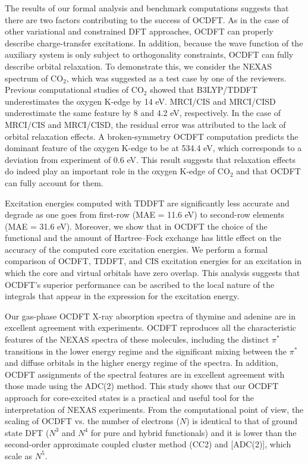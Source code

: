 \documentclass[8.5pt,twoside,twocolumn]{article}
\begin{document}
The results of our formal analysis and benchmark computations suggests that there are two factors contributing to the success of OCDFT.
As in the case of other variational and constrained DFT approaches, OCDFT can properly describe charge-transfer excitations.
In addition, because the wave function of the auxiliary system is only subject to orthogonality constraints, OCDFT can fully describe orbital relaxation.
To demonstrate this, we consider the NEXAS spectrum of CO$_2$, which was suggested as a test case by one of the reviewers. 
Previous computational studies of CO$_2$\cite{Maganas:ji} showed that B3LYP/TDDFT underestimates the oxygen K-edge by 14 eV.
MRCI/CIS and MRCI/CISD underestimate the same feature by 8 and 4.2 eV, respectively.
In the case of MRCI/CIS and MRCI/CISD, the residual error was attributed to the lack of orbital relaxation effects.
A broken-symmetry OCDFT computation predicts the dominant feature of the oxygen K-edge to be at 534.4 eV, which corresponds to a deviation from experiment of 0.6 eV.  This result suggests that relaxation effects do indeed play an important role in the oxygen K-edge of CO$_2$ and that OCDFT can fully account for them.

Excitation energies computed with TDDFT are significantly less accurate and degrade as one goes from first-row (MAE = 11.6 eV) to second-row elements (MAE = 31.6 eV).
Moreover, we show that in OCDFT the choice of the functional and the amount of Hartree--Fock exchange has little effect on the accuracy of the computed core excitation energies.
We perform a formal comparison of OCDFT, TDDFT, and CIS excitation energies for an excitation in which the core and virtual orbitals have zero overlap.
This analysis suggests that OCDFT's superior performance can be ascribed to the local nature of the integrals that appear in the expression for the excitation energy.

Our gas-phase OCDFT X-ray absorption spectra of thymine and adenine are in excellent agreement with experiments. 
OCDFT reproduces all the characteristic features of the NEXAS spectra of these molecules,\cite{plekan_theoretical_2008,wenzel_calculating_2014} including the distinct $\pi^*$ transitions in the lower energy regime and the significant mixing between the $\pi^*$ and diffuse orbitals in the higher energy regime of the spectra.
In addition, OCDFT assignments of the spectral features are in excellent agreement with those made using the ADC(2) method.\cite{plekan_theoretical_2008}
This study shows that our OCDFT approach for core-excited states is a practical and useful tool for the interpretation of NEXAS experiments. 
From the computational point of view, the scaling of OCDFT vs. the number of electrons ($N$) is identical to that of ground state DFT ($N^3$ and $N^4$ for pure and hybrid functionals) and it is lower than the second-order approximate coupled cluster method (CC2)\cite{christiansen_cc2_1995} and [ADC(2)], which scale as $N^5$.
\end{document}
